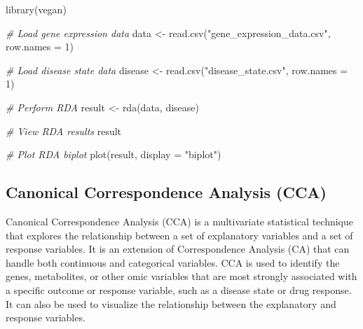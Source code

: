 \documentclass[
]{book}
\newenvironment{Shaded}{\begin{snugshade}}{\end{snugshade}}
\newcommand{\AttributeTok}[1]{\textcolor[rgb]{0.77,0.63,0.00}{#1}}
\newcommand{\CommentTok}[1]{\textcolor[rgb]{0.56,0.35,0.01}{\textit{#1}}}
\newcommand{\DecValTok}[1]{\textcolor[rgb]{0.00,0.00,0.81}{#1}}
\newcommand{\FunctionTok}[1]{\textcolor[rgb]{0.00,0.00,0.00}{#1}}
\newcommand{\NormalTok}[1]{#1}
\newcommand{\OtherTok}[1]{\textcolor[rgb]{0.56,0.35,0.01}{#1}}
\newcommand{\StringTok}[1]{\textcolor[rgb]{0.31,0.60,0.02}{#1}}
\begin{document}
\begin{Shaded}
\begin{Highlighting}[]
\FunctionTok{library}\NormalTok{(vegan)}

\CommentTok{\# Load gene expression data}
\NormalTok{data }\OtherTok{\textless{}{-}} \FunctionTok{read.csv}\NormalTok{(}\StringTok{"gene\_expression\_data.csv"}\NormalTok{, }\AttributeTok{row.names =} \DecValTok{1}\NormalTok{)}

\CommentTok{\# Load disease state data}
\NormalTok{disease }\OtherTok{\textless{}{-}} \FunctionTok{read.csv}\NormalTok{(}\StringTok{"disease\_state.csv"}\NormalTok{, }\AttributeTok{row.names =} \DecValTok{1}\NormalTok{)}

\CommentTok{\# Perform RDA}
\NormalTok{result }\OtherTok{\textless{}{-}} \FunctionTok{rda}\NormalTok{(data, disease)}

\CommentTok{\# View RDA results}
\NormalTok{result}

\CommentTok{\# Plot RDA biplot}
\FunctionTok{plot}\NormalTok{(result, }\AttributeTok{display =} \StringTok{"biplot"}\NormalTok{)}
\end{Highlighting}
\end{Shaded}

\hypertarget{canonical-correspondence-analysis}{%
\subsection{Canonical Correspondence Analysis (CCA)}\label{canonical-correspondence-analysis}}

Canonical Correspondence Analysis (CCA) is a multivariate statistical technique that explores the relationship between a set of explanatory variables and a set of response variables. It is an extension of Correspondence Analysis (CA) that can handle both continuous and categorical variables. CCA is used to identify the genes, metabolites, or other omic variables that are most strongly associated with a specific outcome or response variable, such as a disease state or drug response. It can also be used to visualize the relationship between the explanatory and response variables.
\end{document}
